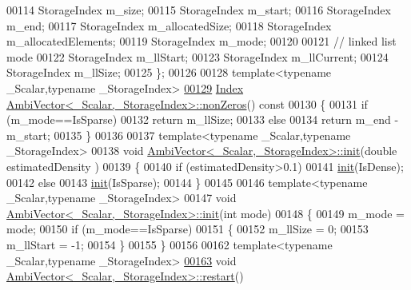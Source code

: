 \begin{DoxyCode}
00114     StorageIndex m\_size;
00115     StorageIndex m\_start;
00116     StorageIndex m\_end;
00117     StorageIndex m\_allocatedSize;
00118     StorageIndex m\_allocatedElements;
00119     StorageIndex m\_mode;
00120 
00121     \textcolor{comment}{// linked list mode}
00122     StorageIndex m\_llStart;
00123     StorageIndex m\_llCurrent;
00124     StorageIndex m\_llSize;
00125 \};
00126 
00128 \textcolor{keyword}{template}<\textcolor{keyword}{typename} \_Scalar,\textcolor{keyword}{typename} \_StorageIndex>
\hyperlink{class_eigen_1_1internal_1_1_ambi_vector_ae0b137e95f52dea2320c16c379d27e74}{00129} \hyperlink{namespace_eigen_a62e77e0933482dafde8fe197d9a2cfde}{Index} \hyperlink{class_eigen_1_1internal_1_1_ambi_vector_ae0b137e95f52dea2320c16c379d27e74}{AmbiVector<\_Scalar,\_StorageIndex>::nonZeros}()\textcolor{keyword}{ const}
00130 \textcolor{keyword}{}\{
00131   \textcolor{keywordflow}{if} (m\_mode==IsSparse)
00132     \textcolor{keywordflow}{return} m\_llSize;
00133   \textcolor{keywordflow}{else}
00134     \textcolor{keywordflow}{return} m\_end - m\_start;
00135 \}
00136 
00137 \textcolor{keyword}{template}<\textcolor{keyword}{typename} \_Scalar,\textcolor{keyword}{typename} \_StorageIndex>
00138 \textcolor{keywordtype}{void} \hyperlink{class_eigen_1_1internal_1_1_ambi_vector}{AmbiVector<\_Scalar,\_StorageIndex>::init}(\textcolor{keywordtype}{double} estimatedDensity
      )
00139 \{
00140   \textcolor{keywordflow}{if} (estimatedDensity>0.1)
00141     \hyperlink{structinit}{init}(IsDense);
00142   \textcolor{keywordflow}{else}
00143     \hyperlink{structinit}{init}(IsSparse);
00144 \}
00145 
00146 \textcolor{keyword}{template}<\textcolor{keyword}{typename} \_Scalar,\textcolor{keyword}{typename} \_StorageIndex>
00147 \textcolor{keywordtype}{void} \hyperlink{class_eigen_1_1internal_1_1_ambi_vector}{AmbiVector<\_Scalar,\_StorageIndex>::init}(\textcolor{keywordtype}{int} mode)
00148 \{
00149   m\_mode = mode;
00150   \textcolor{keywordflow}{if} (m\_mode==IsSparse)
00151   \{
00152     m\_llSize = 0;
00153     m\_llStart = -1;
00154   \}
00155 \}
00156 
00162 \textcolor{keyword}{template}<\textcolor{keyword}{typename} \_Scalar,\textcolor{keyword}{typename} \_StorageIndex>
\hyperlink{class_eigen_1_1internal_1_1_ambi_vector_a518fc22cdfa37e5340350e2a69fa8f1a}{00163} \textcolor{keywordtype}{void} \hyperlink{class_eigen_1_1internal_1_1_ambi_vector_a518fc22cdfa37e5340350e2a69fa8f1a}{AmbiVector<\_Scalar,\_StorageIndex>::restart}()

\end{DoxyCode}
